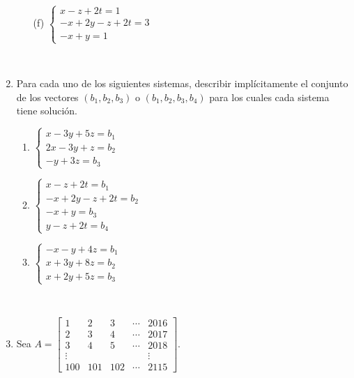 \documentclass[12pt]{amsart}
\begin{document}
\begin{enumerate}
\begin{multicols}{3}
\begin{enumerate}
\item[(f)] $\begin{cases}
x-z+2t = 1\\
-x+2y-z+2t = 3\\
-x+y = 1
\end{cases}$

\end{enumerate}
\end{multicols}

\

\item\label{sistemas con soluciones} Para cada uno de los siguientes sistemas, describir impl\'icitamente el conjunto de los vectores $(b_1,b_2,b_3)$
o $(b_1,b_2,b_3,b_4)$ para los cuales cada sistema tiene soluci\'on.

\begin{multicols}{3}
\begin{enumerate}

\item $\begin{cases}
 x - 3y + 5z = b_1\\
 2x-3y+z = b_2\\
 -y + 3z = b_3
\end{cases}$


\item $\begin{cases}
x-z+2t = b_1\\
-x+2y-z+2t = b_2\\
-x+y = b_3\\
y-z+2t=b_4
\end{cases}$


\item $\begin{cases}
 - x - y + 4 z = b_1\\
 x+3y+8z = b_2\\
 x + 2y + 5z = b_3
\end{cases}$

\end{enumerate}
\end{multicols}

\

\item Sea $A=\begin{bmatrix}1 & 2 & 3 & \cdots & 2016 \\ 2 & 3 & 4 & \cdots & 2017 \\ 3&4&5& \cdots & 2018\\ \vdots & &&& \vdots \\ 100 & 101 & 102& \cdots& 2115\end{bmatrix}$.


\end{enumerate}
\end{document}
